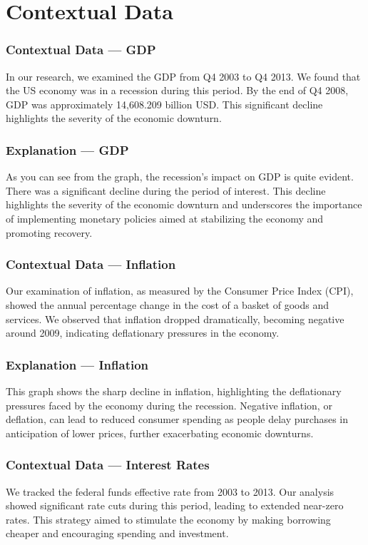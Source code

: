 \documentclass{beamer}
\begin{document}
\section{Contextual Data}
\begin{frame}
    \frametitle{Contextual Data --- GDP}
    In our research, we examined the GDP from Q4 2003 to Q4 2013. We found that the US economy was in a recession during this period. By the end of Q4 2008, GDP was approximately 14,608.209 billion USD. This significant decline highlights the severity of the economic downturn.
\end{frame}

\begin{frame}
    \frametitle{Explanation --- GDP}
    As you can see from the graph, the recession's impact on GDP is quite evident. There was a significant decline during the period of interest. This decline highlights the severity of the economic downturn and underscores the importance of implementing monetary policies aimed at stabilizing the economy and promoting recovery.
\end{frame}

\begin{frame}
    \frametitle{Contextual Data --- Inflation}
    Our examination of inflation, as measured by the Consumer Price Index (CPI), showed the annual percentage change in the cost of a basket of goods and services. We observed that inflation dropped dramatically, becoming negative around 2009, indicating deflationary pressures in the economy.
\end{frame}

\begin{frame}
    \frametitle{Explanation --- Inflation}
    This graph shows the sharp decline in inflation, highlighting the deflationary pressures faced by the economy during the recession. Negative inflation, or deflation, can lead to reduced consumer spending as people delay purchases in anticipation of lower prices, further exacerbating economic downturns.
\end{frame}

\begin{frame}
    \frametitle{Contextual Data --- Interest Rates}
    We tracked the federal funds effective rate from 2003 to 2013. Our analysis showed significant rate cuts during this period, leading to extended near-zero rates. This strategy aimed to stimulate the economy by making borrowing cheaper and encouraging spending and investment.
\end{frame}
\end{document}
